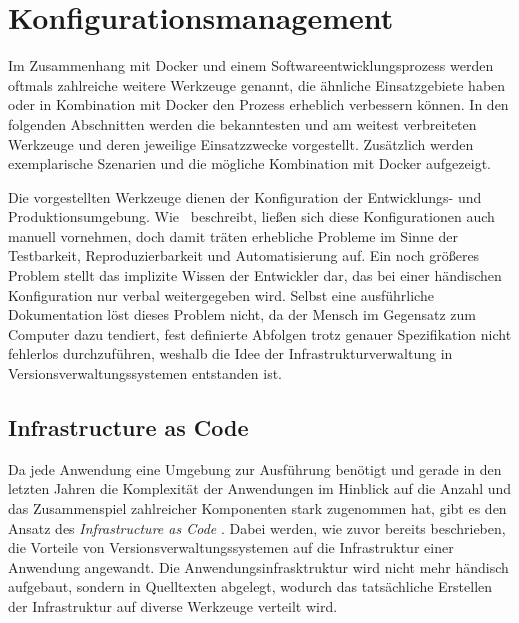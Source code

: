 \chapter{Konfigurationsmanagement}
\label{cha:konfigurationsmanagement}
Im Zusammenhang mit Docker und einem Softwareentwicklungsprozess werden oftmals zahlreiche weitere Werkzeuge genannt, die ähnliche Einsatzgebiete haben oder in Kombination mit Docker den Prozess erheblich verbessern können.
In den folgenden Abschnitten werden die bekanntesten und am weitest verbreiteten Werkzeuge und deren jeweilige Einsatzzwecke vorgestellt.
Zusätzlich werden exemplarische Szenarien und die mögliche Kombination mit Docker aufgezeigt.

Die vorgestellten Werkzeuge dienen der Konfiguration der Entwicklungs- und Produktionsumgebung.
Wie~\autocite[29\psq]{Wolff201604} beschreibt, ließen sich diese Konfigurationen auch manuell vornehmen, doch damit träten erhebliche Probleme im Sinne der Testbarkeit, Reproduzierbarkeit und Automatisierung auf.
Ein noch größeres Problem stellt das implizite Wissen der Entwickler dar, das bei einer händischen Konfiguration nur verbal weitergegeben wird.
Selbst eine ausführliche Dokumentation löst dieses Problem nicht, da der Mensch im Gegensatz zum Computer dazu tendiert, fest definierte Abfolgen trotz genauer Spezifikation nicht fehlerlos durchzuführen, weshalb die Idee der Infrastrukturverwaltung in Versionsverwaltungssystemen entstanden ist.


\section{Infrastructure as Code}
\label{sec:infrastructureascode}
Da jede Anwendung eine Umgebung zur Ausführung benötigt und gerade in den letzten Jahren die Komplexität der Anwendungen im Hinblick auf die Anzahl und das Zusammenspiel zahlreicher Komponenten stark zugenommen hat, gibt es den Ansatz des \emph{Infrastructure as Code} \autocite{InfrastructureAsCode:online}.
Dabei werden, wie zuvor bereits beschrieben, die Vorteile von Versionsverwaltungssystemen auf die Infrastruktur einer Anwendung angewandt.
Die Anwendungsinfrasktruktur wird nicht mehr händisch aufgebaut, sondern in Quelltexten abgelegt, wodurch das tatsächliche Erstellen der Infrastruktur auf diverse Werkzeuge verteilt wird.

